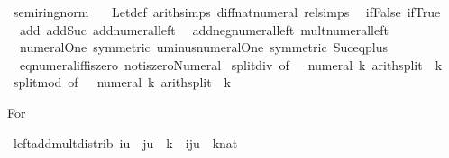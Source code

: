 \begin{isabellebody}
%
\endisadelimML
\isanewline
{}\isamarkupfalse%
\ semiring{\isacharunderscore}{\kern0pt}norm\ {\isacharequal}{\kern0pt}\isanewline
\ \ Let{\isacharunderscore}{\kern0pt}def\ arith{\isacharunderscore}{\kern0pt}simps\ diff{\isacharunderscore}{\kern0pt}nat{\isacharunderscore}{\kern0pt}numeral\ rel{\isacharunderscore}{\kern0pt}simps\isanewline
\ \ if{\isacharunderscore}{\kern0pt}False\ if{\isacharunderscore}{\kern0pt}True\isanewline
\ \ add{\isacharunderscore}{\kern0pt}{}\ add{\isacharunderscore}{\kern0pt}Suc\ add{\isacharunderscore}{\kern0pt}numeral{\isacharunderscore}{\kern0pt}left\isanewline
\ \ add{\isacharunderscore}{\kern0pt}neg{\isacharunderscore}{\kern0pt}numeral{\isacharunderscore}{\kern0pt}left\ mult{\isacharunderscore}{\kern0pt}numeral{\isacharunderscore}{\kern0pt}left\isanewline
\ \ numeral{\isacharunderscore}{\kern0pt}One\ {\isacharbrackleft}{\kern0pt}symmetric{\isacharbrackright}{\kern0pt}\ uminus{\isacharunderscore}{\kern0pt}numeral{\isacharunderscore}{\kern0pt}One\ {\isacharbrackleft}{\kern0pt}symmetric{\isacharbrackright}{\kern0pt}\ Suc{\isacharunderscore}{\kern0pt}eq{\isacharunderscore}{\kern0pt}plus{}\isanewline
\ \ eq{\isacharunderscore}{\kern0pt}numeral{\isacharunderscore}{\kern0pt}iff{\isacharunderscore}{\kern0pt}iszero\ not{\isacharunderscore}{\kern0pt}iszero{\isacharunderscore}{\kern0pt}Numeral{}\isanewline
\isanewline
{}\isamarkupfalse%
\ split{\isacharunderscore}{\kern0pt}div\ {\isacharbrackleft}{\kern0pt}of\ {\isacharunderscore}{\kern0pt}\ {\isacharunderscore}{\kern0pt}\ {\isachardoublequoteopen}numeral\ k{\isachardoublequoteclose}{\isacharcomma}{\kern0pt}\ arith{\isacharunderscore}{\kern0pt}split{\isacharbrackright}{\kern0pt}\ \ k\isanewline
{}\isamarkupfalse%
\ split{\isacharunderscore}{\kern0pt}mod\ {\isacharbrackleft}{\kern0pt}of\ {\isacharunderscore}{\kern0pt}\ {\isacharunderscore}{\kern0pt}\ {\isachardoublequoteopen}numeral\ k{\isachardoublequoteclose}{\isacharcomma}{\kern0pt}\ arith{\isacharunderscore}{\kern0pt}split{\isacharbrackright}{\kern0pt}\ \ k%
\begin{isamarkuptext}%
For %
\end{isamarkuptext}\isamarkuptrue%
\isamarkupfalse%
\ left{\isacharunderscore}{\kern0pt}add{\isacharunderscore}{\kern0pt}mult{\isacharunderscore}{\kern0pt}distrib{\isacharcolon}{\kern0pt}\ {\isachardoublequoteopen}i{\isacharasterisk}{\kern0pt}u\ {\isacharplus}{\kern0pt}\ {\isacharparenleft}{\kern0pt}j{\isacharasterisk}{\kern0pt}u\ {\isacharplus}{\kern0pt}\ k{\isacharparenright}{\kern0pt}\ {\isacharequal}{\kern0pt}\ {\isacharparenleft}{\kern0pt}i{\isacharplus}{\kern0pt}j{\isacharparenright}{\kern0pt}{\isacharasterisk}{\kern0pt}u\ {\isacharplus}{\kern0pt}\ {\isacharparenleft}{\kern0pt}k{\isacharcolon}{\kern0pt}{\isacharcolon}{\kern0pt}nat{\isacharparenright}{\kern0pt}{\isachardoublequoteclose}\isanewline

\end{isabellebody}
